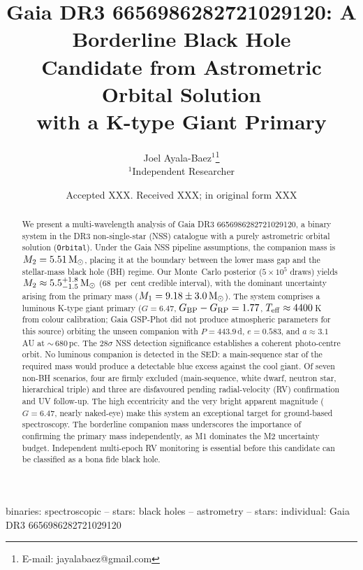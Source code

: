 \documentclass[usenatbib,fleqn]{mnras}
\title[Gaia DR3 6656986282721029120: A Borderline BH Candidate]
{Gaia DR3 6656986282721029120: A Borderline Black Hole\\
 Candidate from Astrometric Orbital Solution\\
 with a K-type Giant Primary}
\author[J. Ayala-Baez]{
  Joel Ayala-Baez$^{1}$\thanks{E-mail: jayalabaez@gmail.com}\\
  $^{1}$Independent Researcher
}
\date{Accepted XXX. Received XXX; in original form XXX}
\newcommand{\Msun}{{\rm M}_\odot}
\begin{document}
\label{firstpage}
\pagerange{\pageref{firstpage}--\pageref{LastPage}}
\maketitle

\begin{abstract}
We present a multi-wavelength analysis of Gaia DR3
6656986282721029120, a binary system in the DR3 non-single-star
(NSS) catalogue with a purely astrometric orbital solution
(\texttt{Orbital}).  Under the Gaia NSS pipeline assumptions, the
companion mass is $M_2 = 5.51\,\Msun$, placing it at the boundary
between the lower mass gap and the stellar-mass black hole (BH)
regime.  Our Monte~Carlo posterior
($5 \times 10^5$ draws) yields
$M_2 \approx 5.5^{+1.8}_{-1.5}\,\Msun$ (68~per~cent credible
interval), with the dominant uncertainty arising from the primary
mass ($M_1 = 9.18 \pm 3.0\,\Msun$).  The system comprises a
luminous K-type giant primary
($G = 6.47$, $G_{\rm BP} - G_{\rm RP} = 1.77$,
$T_{\rm eff} \approx 4400$\,K from colour calibration; Gaia
GSP-Phot did not produce atmospheric parameters for this source)
orbiting the unseen companion with $P = 443.9$\,d,
$e = 0.583$, and $a \approx 3.1$\,AU at $\sim$\,$680$\,pc.
The $28\sigma$ NSS detection significance establishes a coherent
photo-centre orbit.  No luminous companion is detected in the SED:
a main-sequence star of the required mass would produce a detectable
blue excess against the cool giant.  Of seven non-BH scenarios,
four are firmly excluded (main-sequence, white dwarf, neutron star,
hierarchical triple) and three are disfavoured pending
radial-velocity (RV) confirmation and UV follow-up.  The high
eccentricity and the very bright apparent magnitude ($G = 6.47$,
nearly naked-eye) make this system an exceptional target for
ground-based spectroscopy.  The borderline companion mass
underscores the importance of confirming the primary mass
independently, as M1 dominates the M2 uncertainty budget.
Independent multi-epoch RV monitoring is essential before this
candidate can be classified as a bona fide black hole.
\end{abstract}

\begin{keywords}
binaries: spectroscopic -- stars: black holes -- astrometry --
stars: individual: Gaia DR3 6656986282721029120
\end{keywords}

\end{document}

